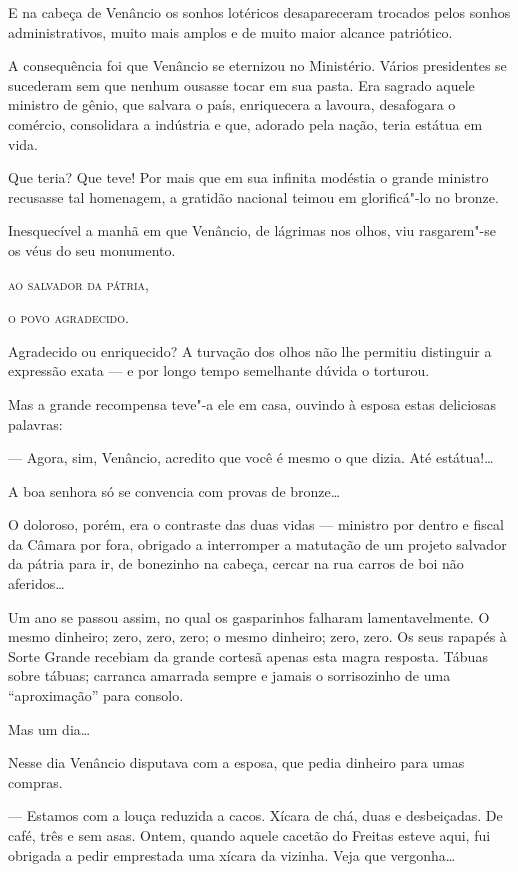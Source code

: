 E na cabeça de Venâncio os sonhos lotéricos desapareceram trocados pelos
sonhos administrativos, muito mais amplos e de muito maior alcance
patriótico.

A consequência foi que Venâncio se eternizou no Ministério. Vários
presidentes se sucederam sem que nenhum ousasse tocar em sua pasta. Era
sagrado aquele ministro de gênio, que salvara o país, enriquecera a
lavoura, desafogara o comércio, consolidara a indústria e que, adorado
pela nação, teria estátua em vida.

Que teria? Que teve! Por mais que em sua infinita modéstia o grande
ministro recusasse tal homenagem, a gratidão nacional teimou em
glorificá"-lo no bronze.

Inesquecível a manhã em que Venâncio, de lágrimas nos olhos, viu
rasgarem"-se os véus do seu monumento.

\textsc{ao salvador da pátria,}

\textsc{o povo agradecido.}

Agradecido ou enriquecido? A turvação dos olhos não lhe permitiu
distinguir a expressão exata --- e por longo tempo semelhante dúvida o
torturou.

Mas a grande recompensa teve"-a ele em casa, ouvindo à esposa estas
deliciosas palavras:

--- Agora, sim, Venâncio, acredito que você é mesmo o que dizia. Até
estátua!\ldots{}

A boa senhora só se convencia com provas de bronze\ldots{}

O doloroso, porém, era o contraste das duas vidas --- ministro por
dentro e fiscal da Câmara por fora, obrigado a interromper a matutação
de um projeto salvador da pátria para ir, de bonezinho na cabeça, cercar
na rua carros de boi não aferidos\ldots{}

Um ano se passou assim, no qual os gasparinhos falharam lamentavelmente.
O mesmo dinheiro; zero, zero, zero; o mesmo dinheiro; zero, zero. Os
seus rapapés à Sorte Grande recebiam da grande cortesã apenas esta magra
resposta. Tábuas sobre tábuas; carranca amarrada sempre e jamais o
sorrisozinho de uma ``aproximação'' para consolo.

Mas um dia\ldots{}

Nesse dia Venâncio disputava com a esposa, que pedia dinheiro para umas
compras.

--- Estamos com a louça reduzida a cacos. Xícara de chá, duas e
desbeiçadas. De café, três e sem asas. Ontem, quando aquele cacetão do
Freitas esteve aqui, fui obrigada a pedir emprestada uma xícara da
vizinha. Veja que vergonha\ldots{}

